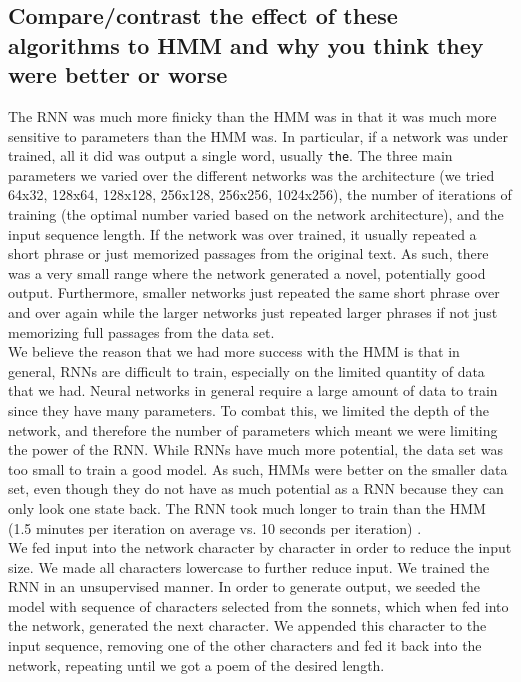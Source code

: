 \subsection{Compare/contrast the effect of these algorithms to HMM and why you think they were better or worse}
The RNN was much more finicky than the HMM was in that it was much more sensitive to parameters than the HMM was. In particular, if a network was under trained, all it did was output a single word, usually \texttt{the}. The three main parameters we varied over the different networks was the architecture (we tried 64x32, 128x64, 128x128, 256x128, 256x256, 1024x256), the number of iterations of training (the optimal number varied based on the network architecture), and the input sequence length. If the network was over trained, it usually repeated a short phrase or just memorized passages from the original text. As such, there was a very small range where the network generated a novel, potentially good output. Furthermore, smaller networks just repeated the same short phrase over and over again while the larger networks just repeated larger phrases if not just memorizing full passages from the data set. \\
\indent We believe the reason that we had more success with the HMM is that in general, RNNs are difficult to train, especially on the limited quantity of data that we had. Neural networks in general require a large amount of data to train since they have many parameters. To combat this, we limited the depth of the network, and therefore the number of parameters which meant we were limiting the power of the RNN. While RNNs have much more potential, the data set was too small to train a good model. As such, HMMs were better on the smaller data set, even though they do not have as much potential as a RNN because they can only look one state back. The RNN took much longer to train than the HMM (1.5 minutes per iteration on average vs. 10 seconds per iteration) . \\
\indent We fed input into the network character by character in order to reduce the input size. We made all characters lowercase to further reduce input. We trained the RNN in an unsupervised manner. In order to generate output, we seeded the model with sequence of characters selected from the sonnets, which when fed into the network, generated the next character. We appended this character to the input sequence, removing one of the other characters and fed it back into the network, repeating until we got a poem of the desired length. \\
